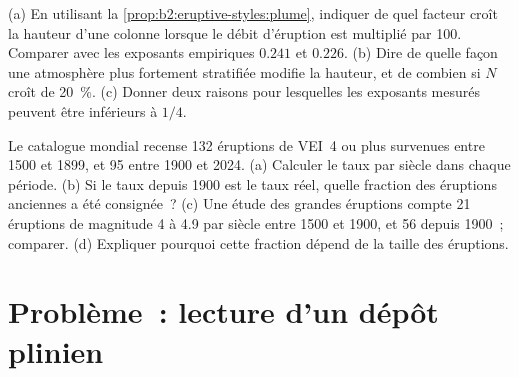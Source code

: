 \begin{exercise}[$\star\star\star$]\label{exo:b2:eruptive-styles:11}
(a) En utilisant la \cref{prop:b2:eruptive-styles:plume}, indiquer de quel facteur croît la hauteur d'une
colonne lorsque le débit d'éruption est multiplié par 100. Comparer avec les exposants empiriques $0.241$ et
$0.226$. (b) Dire de quelle façon une atmosphère plus fortement stratifiée modifie la hauteur, et de combien
si $N$ croît de \qty{20}{\percent}. (c) Donner deux raisons pour lesquelles les exposants mesurés
peuvent être inférieurs
à $1/4$.
\end{exercise}

\begin{exercise}[$\star\star\star$]\label{exo:b2:eruptive-styles:12}
Le catalogue mondial recense 132 éruptions de VEI~4 ou plus survenues entre 1500
et 1899, et 95 entre 1900 et 2024. (a) Calculer le taux par siècle dans chaque
période. (b) Si le taux depuis 1900 est le taux réel, quelle fraction des éruptions anciennes a été
consignée~? (c) Une étude des grandes éruptions compte 21 éruptions de magnitude 4 à 4.9 par siècle
entre 1500 et 1900, et 56 depuis 1900~; comparer. (d) Expliquer pourquoi cette fraction
dépend de la taille des éruptions.
\end{exercise}

\section{Problème~: lecture d'un dépôt plinien}

